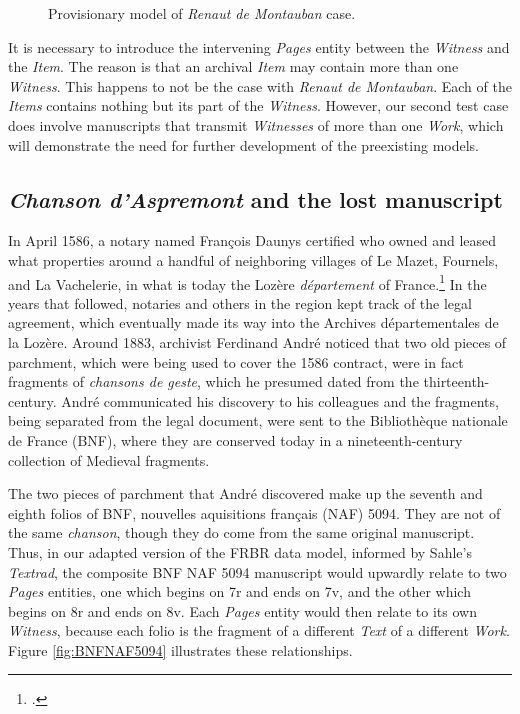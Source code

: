 \begin{figure}[ht]
    \begin{center}
    
    \caption{Provisionary model of \textit{Renaut de Montauban} case.}
    \label{fig:RenautFinal}
    \end{center}
\end{figure}

It is necessary to introduce the intervening \textit{Pages} entity between the \textit{Witness} and the \textit{Item}. The reason is that an archival \textit{Item} may contain more than one \textit{Witness}. This happens to not be the case with \textit{Renaut de Montauban}. Each of the \textit{Items} contains nothing but its part of the \textit{Witness}. However, our second test case does involve manuscripts that transmit \textit{Witnesses} of more than one \textit{Work}, which will demonstrate the need for further development of the preexisting models.

\subsection{\textit{Chanson d'Aspremont} and the lost manuscript}

In April 1586, a notary named François Daunys certified who owned and leased what properties around a handful of neighboring villages of Le Mazet, Fournels, and La Vachelerie, in what is today the Lozère \textit{département} of France.\footcite[][cxii]{camps2016} In the years that followed, notaries and others in the region kept track of the legal agreement, which eventually made its way into the Archives départementales de la Lozère. Around 1883, archivist Ferdinand André noticed that two old pieces of parchment, which were being used to cover the 1586 contract, were in fact fragments of \textit{chansons de geste}, which he presumed dated from the thirteenth-century. André communicated his discovery to his colleagues and the fragments, being separated from the legal document, were sent to the Bibliothèque nationale de France (BNF), where they are conserved today in a nineteenth-century collection of Medieval fragments.

The two pieces of parchment that André discovered make up the seventh and eighth folios of BNF, nouvelles aquisitions français (NAF) 5094. They are not of the same \textit{chanson}, though they do come from the same original manuscript. Thus, in our adapted version of the FRBR data model, informed by Sahle's \textit{Textrad}, the composite BNF NAF 5094 manuscript would upwardly relate to two \textit{Pages} entities, one which begins on 7r and ends on 7v, and the other which begins on 8r and ends on 8v. Each \textit{Pages} entity would then relate to its own \textit{Witness}, because each folio is the fragment of a different \textit{Text} of a different \textit{Work}. Figure \ref{fig:BNFNAF5094} illustrates these relationships.

